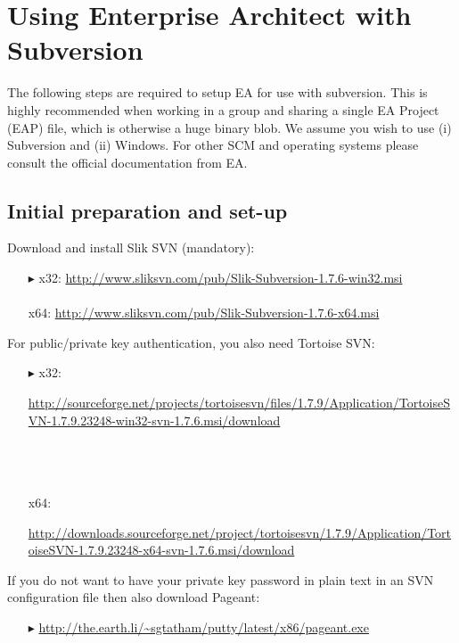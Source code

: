 \section{Using Enterprise Architect with Subversion}

The following steps are required to setup EA for use with subversion. This is highly recommended when working in a group and sharing a single EA Project (EAP)
file, which is otherwise a huge binary blob. We assume you wish to use (i) Subversion and (ii) Windows. For other SCM and operating systems please consult the
official documentation from EA.



\subsection{Initial preparation and set-up}

Download and install Slik SVN (mandatory):
\begin{enumerate}
  \item[$\blacktriangleright$] x32: \small{\url{http://www.sliksvn.com/pub/Slik-Subversion-1.7.6-win32.msi}}\\\\
   x64: {\small \url{http://www.sliksvn.com/pub/Slik-Subversion-1.7.6-x64.msi}}
\end{enumerate}

For public/private key authentication, you also need Tortoise SVN:

\begin{enumerate}
  \item[$\blacktriangleright$] x32: {\small \begin{minipage}{.95\textwidth} 
  \url{http://sourceforge.net/projects/tortoisesvn/files/1.7.9/Application/TortoiseSVN-1.7.9.23248-win32-svn-1.7.6.msi/download}
    \end{minipage}}\\\\\\
  x64: {\small\begin{minipage}{.9\textwidth} 
  \url{http://downloads.sourceforge.net/project/tortoisesvn/1.7.9/Application/TortoiseSVN-1.7.9.23248-x64-svn-1.7.6.msi/download}\end{minipage}}
\end{enumerate}

If you do not want to have your private key password in plain text in an SVN configuration file then also download Pageant:
\begin{enumerate}
  \item[$\blacktriangleright$] {\small \url{http://the.earth.li/~sgtatham/putty/latest/x86/pageant.exe}}
\end{enumerate}

